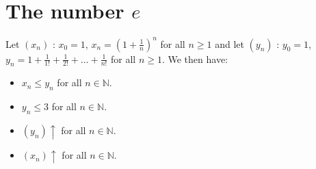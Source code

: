 \section{The number $e$}
Let $(x_n)$ : $x_0 = 1$, $x_n = (1 + \frac{1}{n})^n$ for all $n \geq 1$ and let $(y_n)$ : $y_0 = 1$, $y_n = 1 + \frac{1}{1!} + \frac{1}{2!} + \ldots + \frac{1}{n!}$ for all $n \geq 1$. We then have:
\begin{itemize}[itemsep=1pt,label=$\circ$]
    \item $x_n \leq y_n$ for all $n \in \mathbb{N}$.
    \item $y_n \leq 3$ for all $n \in \mathbb{N}$.
    \item $(y_n) \uparrow$ for all $n \in \mathbb{N}$.
    \item $(x_n) \uparrow$ for all $n \in \mathbb{N}$.
\end{itemize}
